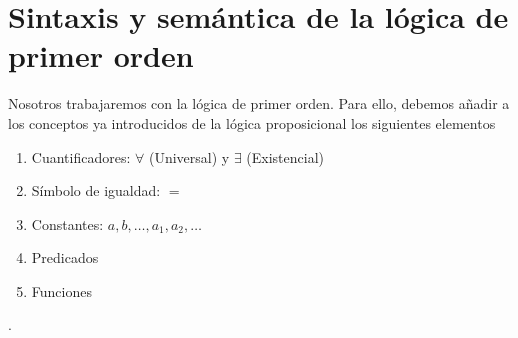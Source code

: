 \chapter{Sintaxis y semántica de la lógica de primer orden}

Nosotros trabajaremos con la lógica de primer orden. Para ello, debemos añadir
a los conceptos ya introducidos de la lógica proposicional los siguientes
elementos

\begin{enumerate}
\item Cuantificadores: $\forall$ (Universal) y $\exists$ (Existencial)
\item Símbolo de igualdad: $=$
\item Constantes: $a,b,\dots,a_1,a_2,\dots$
\item Predicados
\item Funciones
\end{enumerate}
.
